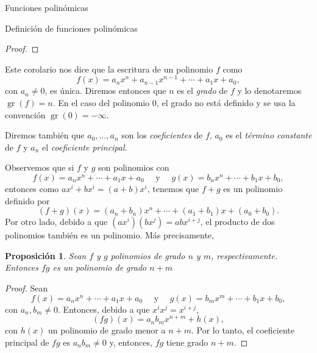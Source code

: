 \documentclass[a4paper,12pt,twoside,spanish,reqno]{amsbook}
\newtheorem{proposicion}[teorema]{Proposici\'on}
\theoremstyle{definition}
\theoremstyle{remark}
\begin{document}
\begin{chapter}{Funciones polinómicas}
\begin{section}{Definición de funciones polinómicas}
\begin{proof}
		
	\end{proof}

	Este corolario nos dice que la escritura de un polinomio $f$ como 
	\begin{equation*}
	f(x) = a_nx^n + a_{n-1}x^{n-1}+\cdots + a_1x +a_0,
	\end{equation*}
	con $a_n \ne 0$, es única. Diremos entonces que $n$ es el  \textit{grado} de $f$ y lo denotaremos $\operatorname{gr}(f)=n$. En  el caso del polinomio 0, el grado no está definido y se usa la convención $\operatorname{gr}(0)=-\infty$. 
	
	Diremos también que  $a_0,\ldots,a_n$ son los \textit{coeficientes} de $f$, $a_0$ es el \textit{término constante} de $f$ y $a_n$  el \textit{coeficiente principal.} 

	Observemos que si $f$ y $g$ son polinomios con   
	\begin{equation*}
	f(x) = a_nx^n + \cdots + a_1x +a_0 \quad\text{ y } \quad g(x) = b_nx^n +\cdots + b_1x +b_0,
	\end{equation*}
	entonces como $ax^i + b x^i = (a+b)x^i$, tenemos que $f+g$ es un polinomio definido por 
	\begin{equation*}
	(f + g)(x) = (a_n+b_n)x^n + \cdots + (a_1+b_1)x +(a_0+b_0).
	\end{equation*}
	Por otro  lado,  debido  a que $(ax^i)(bx^j) = abx^{i+j}$, el producto de dos polinomios también es un polinomio. Más precisamente,
	
	\begin{proposicion}
		Sean $f$ y $g$ polinomios de grado $n$ y $m$,  respectivamente. Entonces $fg$ es un  polinomio de grado $n+m$
	\end{proposicion}
	\begin{proof}
		Sean 
		\begin{equation*}
		f(x) = a_nx^n + \cdots + a_1x +a_0 \quad\text{ y } \quad g(x) = b_mx^m +\cdots + b_1x +b_0,
		\end{equation*}
		con $a_n, b_m \ne 0$. Entonces, debido a que $x^ix^j = x^{i+j}$, 
		\begin{equation}
			(fg)(x) = a_nb_m x^{n+m} + h(x),
 		\end{equation}
		con $h(x)$ un polinomio de grado menor a $n+m$. Por lo tanto, el coeficiente principal de $fg$ es $a_nb_m \ne 0$ y,  entonces, $fg$ tiene grado $n+m$.
	\end{proof}

	
		

\end{section}
\end{chapter}
\end{document}
